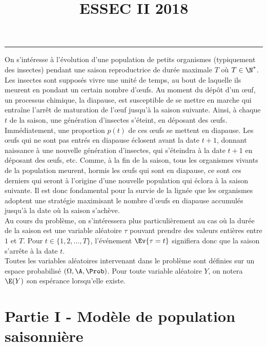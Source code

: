 \documentclass[11pt]{article}%
\title{\bf \vspace{-1.6cm} ESSEC II 2018} %
\author{} %
\date{} %
\begin{document}
\maketitle %
\vspace{-1.2cm}\hrule %
\thispagestyle{fancy}

\vspace*{.4cm}


\noindent
On s'intéresse à l'évolution d'une population de petits organismes 
(typiquement des insectes) pendant une \og saison \fg{} reproductrice 
de durée maximale $T$ où $T \in \N^*$. Les insectes sont supposés vivre 
une unité de temps, au bout de laquelle ils meurent en pondant un 
certain nombre d'{\oe}ufs. Au moment du dépôt d'un {\oe}uf, un 
processus chimique, la diapause, est susceptible de se mettre en marche 
qui entraîne l'arrêt de maturation de l'{\oe}uf jusqu'à la saison 
suivante. Ainsi, à chaque $t$ de la saison, une génération d'insectes 
s'éteint, en déposant des {\oe}ufs. Immédiatement, une proportion 
$p(t)$ de ces {\oe}ufs se mettent en diapause. Les {\oe}ufs qui ne sont 
pas entrés en diapause éclosent avant la date $t+1$, donnant naissance 
à une nouvelle génération d'insectes, qui s'éteindra à la date $t+1$ en 
déposant des {\oe}ufs, etc. Comme, à la fin de la saison, tous les 
organismes vivants de la population meurent, hormis les {\oe}ufs qui 
sont en diapause, ce sont ces derniers qui seront à l'origine d'une 
nouvelle population qui éclora à la saison suivante. Il est donc 
fondamental pour la survie de la lignée que les organismes adoptent une 
stratégie maximisant le nombre d'{\oe}ufs en diapause accumulés jusqu'à 
la date où la saison s'achève.\\[.1cm]
Au cours du problème, on s'intéressera plus particulièrement au cas où 
la durée de la saison est une variable aléatoire $\tau$ pouvant prendre 
des valeurs entières entre $1$ et $T$. Pour $t\in \{1,2, \ldots, T\}$, 
l'événement $\Ev{\tau=t}$ signifiera donc que la saison s'arrête à la 
date $t$.\\[.1cm]
Toutes les variables aléatoires intervenant dans le problème sont 
définies sur un espace probabilisé $(\Omega, \A, \Prob)$. Pour toute 
variable aléatoire $Y$, on notera $\E(Y)$ son espérance lorsqu'elle 
existe.



\section*{Partie I - Modèle de population saisonnière}
\end{document}
